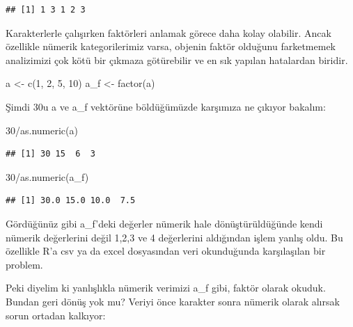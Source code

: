 \documentclass[
]{book}
\newenvironment{Shaded}{\begin{snugshade}}{\end{snugshade}}
\newcommand{\DecValTok}[1]{\textcolor[rgb]{0.00,0.00,0.81}{#1}}
\newcommand{\FunctionTok}[1]{\textcolor[rgb]{0.00,0.00,0.00}{#1}}
\newcommand{\NormalTok}[1]{#1}
\newcommand{\OtherTok}[1]{\textcolor[rgb]{0.56,0.35,0.01}{#1}}
\newcommand{\SpecialCharTok}[1]{\textcolor[rgb]{0.00,0.00,0.00}{#1}}
\begin{document}
\begin{verbatim}
## [1] 1 3 1 2 3
\end{verbatim}

Karakterlerle çalışırken faktörleri anlamak görece daha kolay olabilir. Ancak özellikle nümerik kategorilerimiz varsa, objenin faktör olduğunu farketmemek analizimizi çok kötü bir çıkmaza götürebilir ve en sık yapılan hatalardan biridir.

\begin{Shaded}
\begin{Highlighting}[]
\NormalTok{a }\OtherTok{\textless{}{-}} \FunctionTok{c}\NormalTok{(}\DecValTok{1}\NormalTok{, }\DecValTok{2}\NormalTok{, }\DecValTok{5}\NormalTok{, }\DecValTok{10}\NormalTok{)}
\NormalTok{a\_f }\OtherTok{\textless{}{-}} \FunctionTok{factor}\NormalTok{(a)}
\end{Highlighting}
\end{Shaded}

Şimdi 30u a ve a\_f vektörüne böldüğümüzde karşımıza ne çıkıyor bakalım:

\begin{Shaded}
\begin{Highlighting}[]
\DecValTok{30}\SpecialCharTok{/}\FunctionTok{as.numeric}\NormalTok{(a)}
\end{Highlighting}
\end{Shaded}

\begin{verbatim}
## [1] 30 15  6  3
\end{verbatim}

\begin{Shaded}
\begin{Highlighting}[]
\DecValTok{30}\SpecialCharTok{/}\FunctionTok{as.numeric}\NormalTok{(a\_f)}
\end{Highlighting}
\end{Shaded}

\begin{verbatim}
## [1] 30.0 15.0 10.0  7.5
\end{verbatim}

Gördüğünüz gibi a\_f'deki değerler nümerik hale dönüştürüldüğünde kendi nümerik değerlerini değil 1,2,3 ve 4 değerlerini aldığından işlem yanlış oldu. Bu özellikle R'a csv ya da excel dosyasından veri okunduğunda karşılaşılan bir problem.

Peki diyelim ki yanlışlıkla nümerik verimizi a\_f gibi, faktör olarak okuduk. Bundan geri dönüş yok mu? Veriyi önce karakter sonra nümerik olarak alırsak sorun ortadan kalkıyor:
\end{document}
